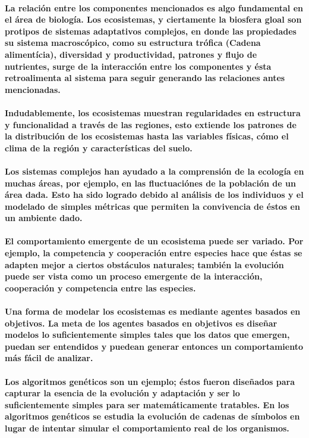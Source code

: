   		\paragraph{La relación entre los componentes mencionados es algo fundamental en el área de biología. Los ecosistemas, y ciertamente la biosfera gloal son protipos de sistemas adaptativos complejos, en donde las propiedades su sistema macroscópico, como su estructura trófica (Cadena alimentícia), diversidad y productividad, patrones y flujo de nutrientes, surge de la interacción entre los componentes y ésta retroalimenta al sistema para seguir generando las relaciones antes mencionadas.}
  		\paragraph{Indudablemente, los ecosistemas muestran regularidades en estructura y funcionalidad a través de las regiones, esto extiende los patrones de la distribución de los ecosistemas hasta las variables físicas, cómo el clima de la región y características del suelo. \cite{7}}
  		\paragraph{Los sistemas complejos han ayudado a la comprensión de la ecología en muchas áreas, por ejemplo, en las fluctuaciónes de la población de un área dada. Esto ha sido logrado debido al análisis de los individuos y el modelado de simples métricas que permiten la convivencia de éstos en un ambiente dado.}  	
  		\paragraph{El comportamiento emergente de un ecosistema puede ser variado. Por ejemplo, la competencia y cooperación entre especies hace que éstas se adapten mejor a ciertos obstáculos naturales; también la evolución puede ser vista como un proceso emergente de la interacción, cooperación y competencia entre las especies.}
  		\paragraph{Una forma de modelar los ecosistemas es mediante agentes basados en objetivos. La meta de los agentes basados en objetivos es diseñar modelos lo suficientemente simples tales que los datos que emergen, puedan ser entendidos y puedean generar entonces un comportamiento más fácil de analizar.}
  		\paragraph{Los algoritmos genéticos son un ejemplo; éstos fueron diseñados para capturar la esencia de la evolución y adaptación y ser lo suficientemente simples para ser matemáticamente tratables. En los algoritmos genéticos se estudia la evolución de cadenas de símbolos en lugar de intentar simular el comportamiento real de los organismos. \cite{8}}  		